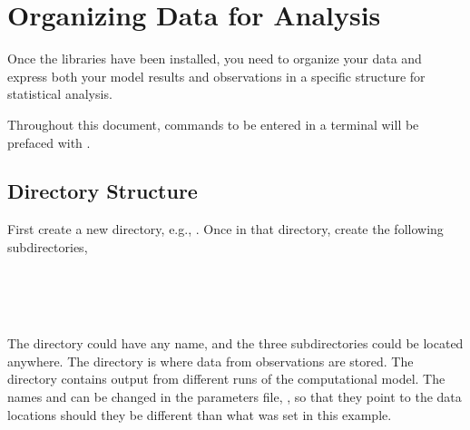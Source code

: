 \section{Organizing Data for Analysis}\label{sec:organizingdata}


Once the libraries have been installed, you need to organize your data and express both your model results and observations in a specific structure for statistical analysis. 

Throughout this document, commands to be entered in a terminal will be prefaced with \commandline{}.

\subsection{Directory Structure}

First create a new directory, e.g., . Once in that directory, create the following subdirectories,

\\
\\
\\

The directory  could have any name, and the three subdirectories could be located anywhere. The  directory is where data from observations are stored. The  directory contains output from different runs of the computational model. The names  and  can be changed in the parameters file, , so that they point to the data locations should they be different than what was set in this example.

